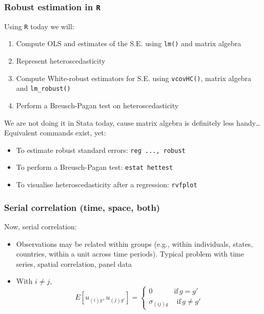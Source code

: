 \documentclass[xcolor=table,dvipsnames]{beamer}
\begin{document}
\begin{frame}
\frametitle{Robust estimation in \texttt{R}}
Using \texttt{R} today we will:
\begin{enumerate}
\item Compute OLS and estimates of the S.E. using \texttt{lm()} and matrix algebra
\item Represent heteroscedasticity
\item Compute White-robust estimators for S.E. using \texttt{vcovHC()}, matrix algebra and \texttt{lm\_robust()}
\item Perform a Breusch-Pagan test on heteroscedasticity
\end{enumerate} \pause

We are not doing it in Stata today, cause matrix algebra is definitely less handy\ldots Equivalent commands exist, yet:
\begin{itemize}
\item To estimate robust standard errors: \texttt{reg ..., robust}
\item To perform a Breusch-Pagan test: \texttt{estat hettest}
\item To visualise heteroscedasticity after a regression: \texttt{rvfplot}
\end{itemize}
\end{frame}

\begin{frame}
\frametitle{Serial correlation (time, space, both)}
Now, serial correlation: 
\begin{itemize}
\item Observations may be related within groups (e.g., within individuals, states, countries, within a unit across time periods). Typical problem with time series, spatial correlation, panel data \pause
\item With $i \neq j$,
\[E[u_{(i)g},u_{(j)g'}] = 
	\begin{cases} 
		0\qquad\quad\text{if}\,g=g'\\
		\sigma_{(ij) g}\quad\,\text{if}\,g\neq g'
	\end{cases}
\]
\end{itemize}
\end{frame}
\end{document}
